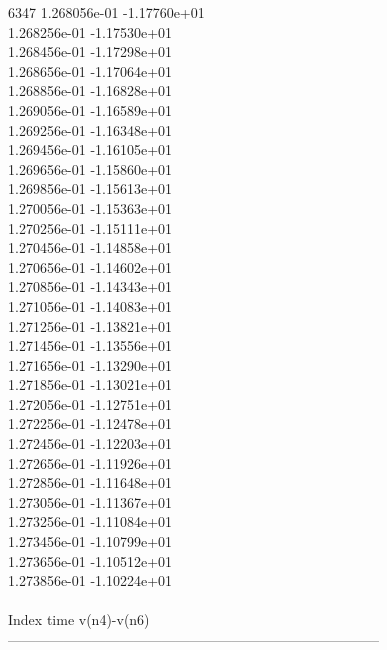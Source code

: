 6347	1.268056e-01	-1.17760e+01	\\ 	1.268256e-01	-1.17530e+01	\\ 	1.268456e-01	-1.17298e+01	\\ 	1.268656e-01	-1.17064e+01	\\ 	1.268856e-01	-1.16828e+01	\\ 	1.269056e-01	-1.16589e+01	\\ 	1.269256e-01	-1.16348e+01	\\ 	1.269456e-01	-1.16105e+01	\\ 	1.269656e-01	-1.15860e+01	\\ 	1.269856e-01	-1.15613e+01	\\ 	1.270056e-01	-1.15363e+01	\\ 	1.270256e-01	-1.15111e+01	\\ 	1.270456e-01	-1.14858e+01	\\ 	1.270656e-01	-1.14602e+01	\\ 	1.270856e-01	-1.14343e+01	\\ 	1.271056e-01	-1.14083e+01	\\ 	1.271256e-01	-1.13821e+01	\\ 	1.271456e-01	-1.13556e+01	\\ 	1.271656e-01	-1.13290e+01	\\ 	1.271856e-01	-1.13021e+01	\\ 	1.272056e-01	-1.12751e+01	\\ 	1.272256e-01	-1.12478e+01	\\ 	1.272456e-01	-1.12203e+01	\\ 	1.272656e-01	-1.11926e+01	\\ 	1.272856e-01	-1.11648e+01	\\ 	1.273056e-01	-1.11367e+01	\\ 	1.273256e-01	-1.11084e+01	\\ 	1.273456e-01	-1.10799e+01	\\ 	1.273656e-01	-1.10512e+01	\\ 	1.273856e-01	-1.10224e+01	\\ \hline
\\ \hline
Index   time            v(n4)-v(n6)     \\ \hline
--------------------------------------------------------------------------------\\ \hline
